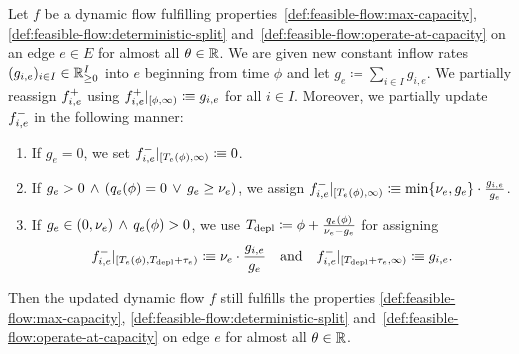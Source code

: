 \begin{theorem}\label{thm:extend-edge}
    Let $f$ be a dynamic flow fulfilling properties~\ref{def:feasible-flow:max-capacity}, \ref{def:feasible-flow:deterministic-split} and~\ref{def:feasible-flow:operate-at-capacity} on an edge $e\in E$ for almost all $\theta\in\mathbb{R}$.
    We are given new constant inflow rates $(g_{i,e})_{i\in I}\in\mathbb{R}_{\geq0}^{I}$ into $e$ beginning from time $\phi$ and let $g_e \coloneqq \sum_{i\in I} g_{i,e}$.
    We partially reassign ${f}^+_{i,e}$ using ${f}^+_{i,e}\vert_{[\phi,\infty)} \vcentcolon\mspace{-1.2mu}\equiv g_{i,e}$ for all $i\in I$.
    Moreover, we partially update ${f}^-_{i,e}$ in the following manner:
    \begin{enumerate}[label=\textbf{Case \Roman*.}, wide=0.5em, labelwidth=4.5em]
        \item If $g_e = 0$, we set ${f}^-_{i,e}\vert_{[T_e(\phi), \infty)} \vcentcolon\mspace{-1.2mu}\equiv 0$.
        
        \item If $g_e > 0 \,\land\, \left( q_e(\phi) = 0 \,\lor\, g_e \geq \nu_e \right)$, we assign ${f}^-_{i,e}\vert_{[T_e(\phi), \infty)} \vcentcolon\mspace{-1.2mu}\equiv \min\{\nu_e, g_e\}\cdot \frac{g_{i,e}}{g_e}$.
        
        \item If $g_e \in (0, \nu_e) \,\land\, q_e(\phi) > 0$, we use $T_{\textnormal{depl}} \coloneqq \phi + \frac{q_e(\phi)}{\nu_e - g_e}$ for assigning
        \begin{align*}
            {f}^-_{i,e}\vert_{[T_e(\phi), T_{\textnormal{depl}} + \tau_e)}
            \vcentcolon\mspace{-1.2mu}\equiv \nu_e \cdot \frac{g_{i,e}}{g_e}
            \quad\text{and}\quad
            {f}^-_{i,e}\vert_{[T_{\textnormal{depl}} + \tau_e, \infty)}
            \vcentcolon\mspace{-1.2mu}\equiv g_{i,e}.
        \end{align*}
    \end{enumerate}
    Then the updated dynamic flow $f$ still fulfills the properties \ref{def:feasible-flow:max-capacity}, \ref{def:feasible-flow:deterministic-split} and~\ref{def:feasible-flow:operate-at-capacity} on edge $e$ for almost all $\theta\in \mathbb{R}$.
\end{theorem}
